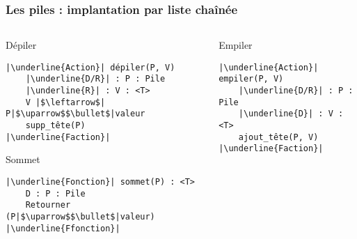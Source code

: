 \documentclass[table,handout,tikz,12pt,svgnames]{beamer}
\begin{document}
\begin{frame}[fragile=singleslide]
	\frametitle{Les piles : implantation par liste chaînée}
	\begin{block}{}
		\begin{columns}[T]
			\hspace{-0.5cm}
			\begin{column}{0.7\textwidth}
				\begin{block}{Dépiler} %
					\begin{verbatim}
|\underline{Action}| dépiler(P, V)
	|\underline{D/R}| : P : Pile
	|\underline{R}| : V : <T>
	V |$\leftarrow$| P|$\uparrow$$\bullet$|valeur
	supp_tête(P)
|\underline{Faction}|
					\end{verbatim}
				\end{block}
				\begin{block}{Sommet} %
					\begin{verbatim}
|\underline{Fonction}| sommet(P) : <T>
	D : P : Pile
	Retourner (P|$\uparrow$$\bullet$|valeur)
|\underline{Ffonction}|
					\end{verbatim}
				\end{block}
			\end{column}
			\hspace{-1.3cm}
			\vrule{}
			\hspace{0.3cm}
			\begin{column}{0.38\textwidth}
				\begin{block}{Empiler} %
					\begin{verbatim}
|\underline{Action}| empiler(P, V)
	|\underline{D/R}| : P : Pile
	|\underline{D}| : V : <T>
	ajout_tête(P, V)
|\underline{Faction}|
					\end{verbatim}
				\end{block}		
			\end{column}
		\end{columns}
	\end{block}
\end{frame}
\end{document}
